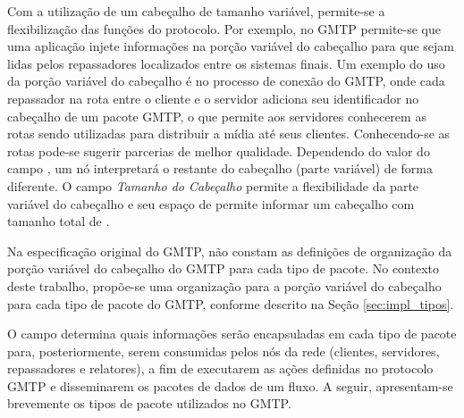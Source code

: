 Com a utilização de um cabeçalho de tamanho variável, permite-se a flexibilização das funções do protocolo. Por exemplo, no GMTP permite-se que uma aplicação injete informações na porção variável do cabeçalho para que sejam lidas pelos repassadores localizados entre os sistemas finais. 
Um exemplo do uso da porção variável do cabeçalho é no processo de conexão do GMTP, onde cada repassador na rota entre o cliente e o servidor adiciona seu identificador no cabeçalho de um pacote GMTP, o que permite aos servidores conhecerem as rotas sendo utilizadas para distribuir a mídia até seus clientes. Conhecendo-se as rotas pode-se sugerir parcerias de melhor qualidade.
Dependendo do valor do campo , um nó interpretará o restante do cabeçalho (parte variável) de forma diferente. O campo \textit{Tamanho do Cabeçalho} permite a flexibilidade da parte variável do cabeçalho e seu espaço de  permite informar um cabeçalho com tamanho total de .

Na especificação original do GMTP, não constam as definições de organização da porção variável do cabeçalho do GMTP para cada tipo de pacote. No contexto deste trabalho, propõe-se uma organização para a porção variável do cabeçalho para cada tipo de pacote do GMTP, conforme descrito na Seção \ref{sec:impl_tipos}.

O campo  determina quais informações serão encapsuladas em cada tipo de pacote para, posteriormente, serem consumidas pelos nós da rede (clientes, servidores, repassadores e relatores), a fim de executarem as ações definidas no protocolo GMTP e disseminarem os pacotes de dados de um fluxo. 
A seguir, apresentam-se brevemente os tipos de pacote utilizados no GMTP.

